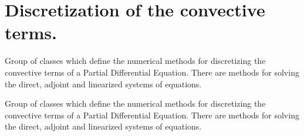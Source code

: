 \hypertarget{group__ConvDiscr}{}\section{Discretization of the convective terms.}
\label{group__ConvDiscr}


Group of classes which define the numerical methods for discretizing the convective terms of a Partial Differential Equation. There are methods for solving the direct, adjoint and linearized systems of equations.  


Group of classes which define the numerical methods for discretizing the convective terms of a Partial Differential Equation. There are methods for solving the direct, adjoint and linearized systems of equations. 

